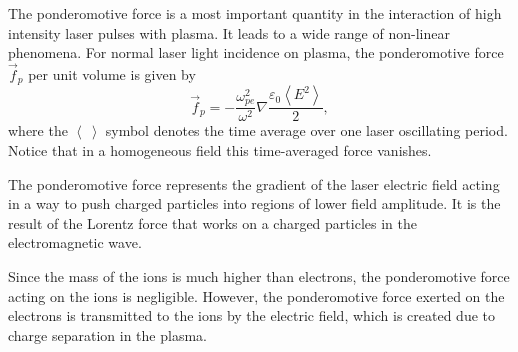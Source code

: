 The ponderomotive force is a most important quantity in the interaction of high intensity laser pulses with plasma. It leads to a wide range of non-linear phenomena. For normal laser light incidence on plasma, the ponderomotive force $ \vec{f}_{p} $ per unit volume is given by
\begin{equation}
\label{2.5.1.1}
\vec{f}_{p} = - \frac{\omega_{pe}^{2}}{\omega^{2}} \nabla \frac{\varepsilon_0 \left\langle E^{2} \right\rangle}{2},
\end{equation}
where the $ \left\langle \: \right\rangle $ symbol denotes the time average over one laser oscillating period. Notice that in a homogeneous field this time-averaged force vanishes.

The ponderomotive force represents the gradient of the laser electric field acting in a way to push charged particles into regions of lower field amplitude. It is the result of the Lorentz force that works on a charged particles in the electromagnetic wave.

Since the mass of the ions is much higher than electrons, the ponderomotive force acting on the ions is negligible. However, the ponderomotive force exerted on the electrons is transmitted to the ions by the electric field, which is created due to charge separation in the plasma.